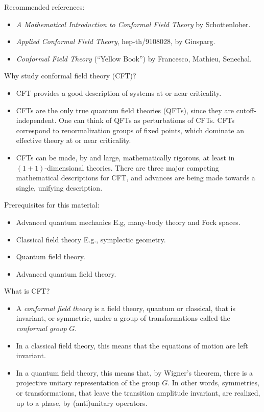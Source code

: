 \noindent Recommended references:

\begin{itemize}
\item \textit{A Mathematical Introduction to Conformal Field Theory} by Schottenloher.
\item \textit{Applied Conformal Field Theory}, hep-th/9108028, by Ginsparg.
\item \textit{Conformal Field Theory} (``Yellow Book'') by Francesco, Mathieu, Senechal.
\end{itemize}

\noindent Why study conformal field theory (CFT)?

\begin{itemize}
\item CFT provides a good description of systems at or near criticality.
\item CFTs are the only true quantum field theories (QFTs), since they are cutoff-independent. One can think of QFTs as perturbations of CFTs. CFTs correspond to renormalization groups of fixed points, which dominate an effective theory at or near criticality.
\item CFTs can be made, by and large, mathematically rigorous, at least in $(1+1)$-dimensional theories. There are three major competing mathematical descriptions for CFT, and advances are being made towards a single, unifying description.
\end{itemize}

\noindent Prerequisites for this material:

\begin{itemize}
\item Advanced quantum mechanics
	\subitem E.g, many-body theory and Fock spaces.
\item Classical field theory
	\subitem E.g., symplectic geometry.
\item Quantum field theory.
\item Advanced quantum field theory.
\end{itemize}

\noindent What is CFT?

\begin{itemize}
\item A \textit{conformal field theory} is a field theory, quantum or classical, that is invariant, or symmetric, under a group of transformations called the \textit{conformal group} $G$.
\item In a classical field theory, this means that the equations of motion are left invariant.
\item In a quantum field theory, this means that, by Wigner's theorem, there is a projective unitary representation of the group $G$. In other words, symmetries, or transformations, that leave the transition amplitude invariant, are realized, up to a phase, by (anti)unitary operators.
\end{itemize}

